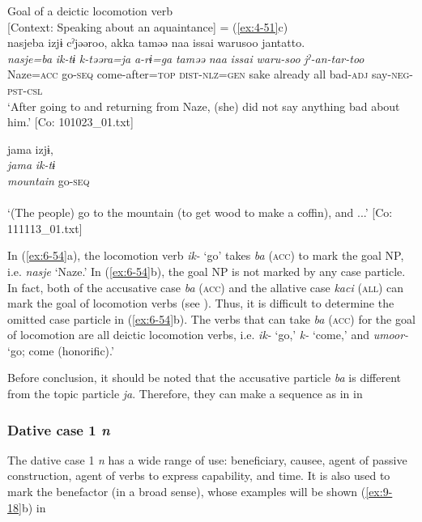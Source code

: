 \ea\label{ex:6-54}
 Goal of a deictic locomotion verb\\

 \ea
 {\TM}
 [Context: Speaking about an aquaintance] = (\ref{ex:4-51}c)\\
\glll nasjeba  izjɨ  cˀjəəroo,  akka  taməə  naa  issai  warusoo  jantatto.\\
\textit{nasje=ba}  \textit{ik-tɨ}  \textit{k-təəra=ja}  \textit{a-rɨ=ga}  \textit{taməə}      \textit{naa}  \textit{issai}  \textit{waru-soo}  \textit{jˀ-an-tar-too}\\
Naze=\textsc{acc}  go-\textsc{seq}  come-after=\textsc{top}  \textsc{dist}-\textsc{nlz}=\textsc{gen}  sake    already  all  bad-\textsc{adj}  say-\textsc{neg}-\textsc{pst}-\textsc{csl}\\
\glt ‘After going to and returning from Naze, (she) did not say anything bad about him.’ [Co: 101023\_01.txt]

\ex
{\TM}
\glll  jama  izjɨ,\\
\textit{jama}  \textit{ik-tɨ}\\
\textit{mountain}  go-\textsc{seq}\\\\
\glt ‘(The people) go to the mountain (to get wood to make a coffin), and ...’ [Co: 111113\_01.txt]
\z
\z

In (\ref{ex:6-54}a), the locomotion verb \textit{ik-} ‘go’ takes \textit{ba} (\textsc{acc}) to mark the goal NP, i.e. \textit{nasje} ‘Naze.’ In (\ref{ex:6-54}b), the goal NP is not marked by any case particle. In fact, both of the accusative case \textit{ba} (\textsc{acc}) and the allative case \textit{kaci} (\textsc{all}) can mark the goal of locomotion verbs (see ). Thus, it is difficult to determine the omitted case particle in (\ref{ex:6-54}b). The verbs that can take \textit{ba} (\textsc{acc}) for the goal of locomotion are all deictic locomotion verbs, i.e. \textit{ik-} ‘go,’ \textit{k-} ‘come,’ and \textit{umoor-} ‘go; come (honorific).’

  Before conclusion, it should be noted that the accusative particle \textit{ba} is different from the topic particle \textit{ja}. Therefore, they can make a sequence as in  in 

\subsubsection{Dative case 1 \textit{n}}

The dative case 1 \textit{n} has a wide range of use: beneficiary, causee, agent of passive construction, agent of verbs to express capability, and time. It is also used to mark the benefactor (in a broad sense), whose examples will be shown (\ref{ex:9-18}b) in 

